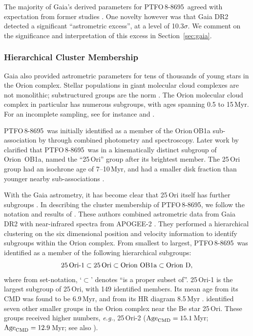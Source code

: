 \documentclass[12pt,twocolumn,tighten]{aastex62}
\newcommand{\ptfo}{PTFO$\,$8-8695}
\begin{document}
The majority of Gaia's derived parameters for \ptfo\ agreed with
expectation from former studies
\citep{briceno_cida_2005,van_eyken_ptf_2012}.  One novelty however was
that Gaia DR2 detected a significant ``astrometric excess'', at a
level of 10.3$\sigma$.  We comment on the significance and
interpretation of this excess in Section~\ref{sec:gaia}.


\subsubsection{Hierarchical Cluster Membership}
\label{subsec:hierarchical}

Gaia also provided astrometric parameters for tens of thousands of
young stars in the Orion complex.  Stellar populations in giant
molecular cloud complexes are not monolithic; substructured groups are
the norm \citep{briceno_lowmassOB_2007}.  The Orion molecular cloud
complex in particular has numerous subgroups, with ages spanning 0.5
to 15$\,$Myr. For an incomplete sampling, see for instance
\citet{briceno_cida_2005,jeffries_kinematic_2006,briceno_25_2007,kounkel_apogee2_2018}
and \citet{briceno_cidaII_2019}.

\ptfo\ was initially identified as a member of the Orion$\,$OB1a
sub-association by \citet{briceno_cida_2005} through combined
photometry and spectroscopy.  Later work by \citet{briceno_25_2007}
clarified that \ptfo\ was in a kinematically distinct subgroup of
Orion~OB1a, named the ``25$\,$Ori'' group after its brightest
member. The 25$\,$Ori group had an isochrone age of 7--10$\,$Myr, and
had a smaller disk fraction than younger nearby sub-associations
\citep{hernandez_spitzer_2007}.

With the Gaia astrometry, it has become clear that 25$\,$Ori itself
has further subgroups
\citep{kounkel_apogee2_2018,briceno_cidaII_2019}.  In describing the
cluster membership of \ptfo, we follow the notation and results of
\citet{kounkel_apogee2_2018}.  These authors combined astrometric data
from Gaia DR2 with near-infrared spectra from APOGEE-2
\citep{gunn_sdss_2006,majewski_apache_2017,blanton_sloan_2017,zasowski_target_2017,cottle_apogee2_2018}.
They performed a hierarchical clustering on the six dimensional
position and velocity information to identify subgroups within the
Orion complex.  From smallest to largest, \ptfo\ was identified
as a member of the following hierarchical subgroups:
\begin{equation}
  {\rm 25\,Ori\text{-}1}
  \subset {\rm 25\,Ori}
  \subset {\rm Orion\ OB1a}
  \subset {\rm Orion\ D},
\end{equation}
where from set-notation, `$\subset$' denotes ``is a proper subset
of''.  25$\,$Ori-1 is the largest subgroup of 25$\,$Ori, with 149
identified members.  Its mean age from its CMD was found to be
6.9$\,$Myr, and from its HR diagram 8.5$\,$Myr
\citep{kounkel_apogee2_2018}.  \citet{kounkel_apogee2_2018} identified
seven other smaller groups in the Orion complex near the Be star
25$\,$Ori. These groups received higher numbers, {\it e.g.},
25$\,$Ori-2 (${\rm Age}_{\rm CMD} =15.1\,$Myr; ${\rm Age}_{\rm CMD}
=12.9\,$Myr; see also \citealt{briceno_cidaII_2019}).
\end{document}
